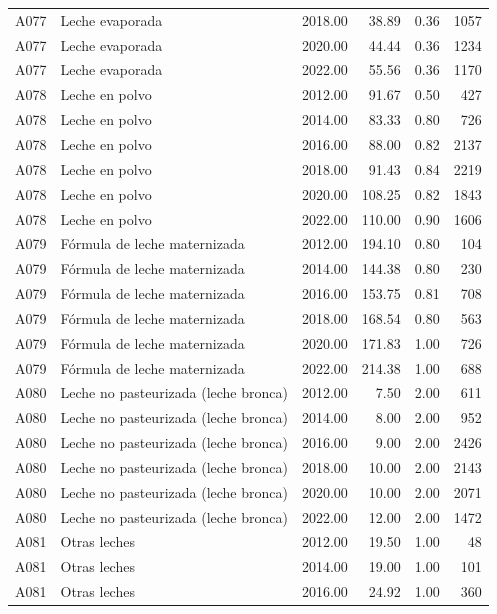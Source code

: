 \begin{table}[ht]
\begin{tabular}{llrrrr}
  A077 & Leche evaporada & 2018.00 & 38.89 & 0.36 & 1057 \\ 
  A077 & Leche evaporada & 2020.00 & 44.44 & 0.36 & 1234 \\ 
  A077 & Leche evaporada & 2022.00 & 55.56 & 0.36 & 1170 \\ 
  A078 & Leche en polvo & 2012.00 & 91.67 & 0.50 & 427 \\ 
  A078 & Leche en polvo & 2014.00 & 83.33 & 0.80 & 726 \\ 
  A078 & Leche en polvo & 2016.00 & 88.00 & 0.82 & 2137 \\ 
  A078 & Leche en polvo & 2018.00 & 91.43 & 0.84 & 2219 \\ 
  A078 & Leche en polvo & 2020.00 & 108.25 & 0.82 & 1843 \\ 
  A078 & Leche en polvo & 2022.00 & 110.00 & 0.90 & 1606 \\ 
  A079 & Fórmula de leche maternizada & 2012.00 & 194.10 & 0.80 & 104 \\ 
  A079 & Fórmula de leche maternizada & 2014.00 & 144.38 & 0.80 & 230 \\ 
  A079 & Fórmula de leche maternizada & 2016.00 & 153.75 & 0.81 & 708 \\ 
  A079 & Fórmula de leche maternizada & 2018.00 & 168.54 & 0.80 & 563 \\ 
  A079 & Fórmula de leche maternizada & 2020.00 & 171.83 & 1.00 & 726 \\ 
  A079 & Fórmula de leche maternizada & 2022.00 & 214.38 & 1.00 & 688 \\ 
  A080 & Leche no pasteurizada (leche bronca) & 2012.00 & 7.50 & 2.00 & 611 \\ 
  A080 & Leche no pasteurizada (leche bronca) & 2014.00 & 8.00 & 2.00 & 952 \\ 
  A080 & Leche no pasteurizada (leche bronca) & 2016.00 & 9.00 & 2.00 & 2426 \\ 
  A080 & Leche no pasteurizada (leche bronca) & 2018.00 & 10.00 & 2.00 & 2143 \\ 
  A080 & Leche no pasteurizada (leche bronca) & 2020.00 & 10.00 & 2.00 & 2071 \\ 
  A080 & Leche no pasteurizada (leche bronca) & 2022.00 & 12.00 & 2.00 & 1472 \\ 
  A081 & Otras leches & 2012.00 & 19.50 & 1.00 &  48 \\ 
  A081 & Otras leches & 2014.00 & 19.00 & 1.00 & 101 \\ 
  A081 & Otras leches & 2016.00 & 24.92 & 1.00 & 360 \\ 

\end{tabular}
\end{table}
